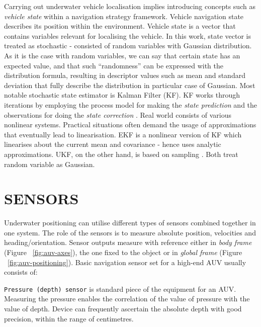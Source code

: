 \documentclass[a4paper, 10pt, conference]{ieeeconf}        %
\newcommand{\T}{\texttt}
\begin{document}
Carrying out underwater vehicle localisation implies introducing concepts such as \textit{vehicle state} within a navigation strategy framework. Vehicle navigation state describes its position within the environment. Vehicle state is a vector that contains variables relevant for localising the vehicle. In this work, state vector is treated as stochastic - consisted of random variables with Gaussian distribution. As it is the case with random variables, we can say that certain state has an expected value, and that such ``randomness'' can be expressed with the distribution formula, resulting in descriptor values such as mean and standard deviation that fully describe the distribution in particular case of Gaussian. Most notable stochastic state estimator is Kalman Filter (KF). KF works through iterations by employing the process model for making the \textit{state prediction} and the observations for doing the \textit{state correction} \cite{negenborn03}. Real world consists of various nonlinear systems. Practical situations often demand the usage of approximations that eventually lead to linearisation. EKF is a nonlinear version of KF which linearises about the current mean and covariance - hence uses analytic approximations. UKF, on the other hand, is based on sampling \cite{julier96}. Both treat random variable as Gaussian.

\section{SENSORS} \label{sec:sensors}
Underwater positioning can utilise different types of sensors combined together in one system. The role of the sensors is to measure absolute position, velocities and heading/orientation. Sensor outputs measure with reference either in \textit{body frame} (Figure ~\ref{fig:auv-axes}), the one fixed to the object or in \textit{global frame} (Figure ~\ref{fig:auv-positioning}). Basic navigation sensor set for a high-end AUV usually consists of:%

\T{Pressure (depth) sensor} is standard piece of the equipment for an AUV. Measuring the pressure enables the correlation of the value of pressure with the value of depth. Device can frequently ascertain the absolute depth with good precision, within the range of centimetres. 
\end{document}
